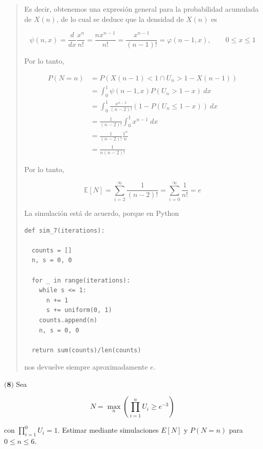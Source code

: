 \documentclass[a4paper, 12pt]{article}
\begin{document}
\begin{quote}
Es decir, obtenemos una expresión general para la probabilidad acumulada de
$X(n)$, de lo cual se deduce que la densidad de $X(n)$ es 

\begin{equation*}
  \psi(n, x) = \frac{d}{dx} \frac{x^n}{n!} = \frac{nx^{n-1}}{n!} =
  \frac{x^{n-1}}{(n-1)!} = \varphi(n-1, x), \qquad 0 \leq x \leq 1
\end{equation*}

Por lo tanto,

\begin{align*}
  P(N = n) 
  &= P(X(n-1) < 1 \cap U_n > 1 -X(n-1)) \\ 
  &=\int_0^1 \psi(n-1, x) P(U_n > 1 - x) ~ dx \\ 
  &=\int_0^1 \frac{x^{n-2}}{(n-2)!}(1 - P(U_n \leq 1-x)) ~ dx \\ 
  &=\frac{1}{(n-2)!}\int_0^1  x^{n-1} ~ dx \\ 
  &=\frac{1}{(n-2)!} \frac{1^n}{n} \\ 
  &= \frac{1}{n(n-2)!}
\end{align*}

Por lo tanto, 

\begin{equation*}
  \mathbb{E}\left[ N \right] = \sum_{i=2}^\infty \frac{1}{(n-2)!} =
  \sum_{i=0}^\infty \frac{1}{n!} = e
\end{equation*}

La simulación está de acuerdo, porque en Python 

\begin{verbatim}
def sim_7(iterations):

  counts = []
  n, s = 0, 0

  for _ in range(iterations):
    while s <= 1:
      n += 1
      s += uniform(0, 1)
    counts.append(n)
    n, s = 0, 0
 
  return sum(counts)/len(counts)
\end{verbatim}

nos devuelve siempre aproximadamente $e$.

\end{quote}

\pagebreak 

$\textbf{(8)}$ Sea  

\begin{equation*}
  N = \max_{n} \left( \prod_{i=1}^n U_i \geq e^{-3} \right) 
\end{equation*}

con $\prod_{i=1}^0 U_i = 1$. Estimar mediante simulaciones $E[N]$ y $P(N = n)$
para $0 \leq n \leq 6$.
\end{document}
